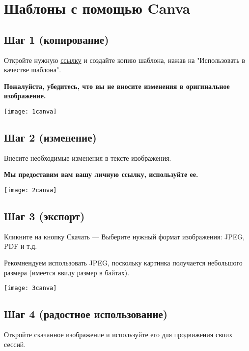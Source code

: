 \newpage
\section*{Шаблоны с помощью Canva}
\label{sec:templates}

\subsection*{Шаг 1 (копирование)}
Откройте нужную \hyperref[sec:templatesRefs]{ссылку} и создайте копию шаблона, нажав на "Использовать в качестве шаблона".

\textbf{Пожалуйста, убедитесь, что вы не вносите изменения в оригинальное изображение.}
\begin{center}
\texttt{[image: 1canva]}
\end{center}

\subsection*{Шаг 2 (изменение)}

Внесите необходимые изменения в тексте изображения. 

\textbf{Мы предоставим вам вашу личную ссылку, используйте ее.}
\begin{center}
\texttt{[image: 2canva]}
\end{center}
% 
% 


\subsection*{Шаг 3 (экспорт)}
Кликните на кнопку Скачать — Выберите нужный формат изображения: JPEG, PDF и т.д.

Рекомнендуем использовать JPEG, поскольку картинка получается небольшого размера (имеется ввиду размер в байтах).
\begin{center}
\texttt{[image: 3canva]}
\end{center}


\subsection*{Шаг 4 (радостное использование)}
Откройте скачанное изображение и используйте его для продвижения своих сессий.


